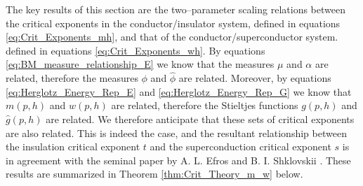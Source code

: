 \documentclass[english,12pt]{ttuthes}
\newcommand{\ph}{\hat{\phi}}
\begin{document}
The key results of this section are the two--parameter scaling
relations between the critical exponents in the conductor/insulator
system,
defined in equations \eqref{eq:Crit_Exponents_mh},
and that of the conductor/superconductor system.
defined in equations \eqref{eq:Crit_Exponents_wh}.
By equations  \eqref{eq:BM_measure_relationship_E} we know that the
measures $\mu$ and $\alpha$ are related, therefore the measures $\phi$ and $\ph$
are related. Moreover, by equations \eqref{eq:Herglotz_Energy_Rep_E}
and \eqref{eq:Herglotz_Energy_Rep_G} we know that $m(p,h)$ and
$w(p,h)$ are related, therefore the Stieltjes functions $g(p,h)$ and
$\hat{g}(p,h)$ are related. We therefore anticipate that these sets of
critical exponents 
are also related. This is indeed the case, and the resultant
relationship between the insulation critical exponent $t$ and the
superconduction critical exponent $s$ is in agreement with the seminal
paper by A. L. Efros and B. I. Shklovskii \cite{Efros:PSSB-303}.
These results are summarized in Theorem \ref{thm:Crit_Theory_m_w}
below. 
%
%
%
\end{document}
